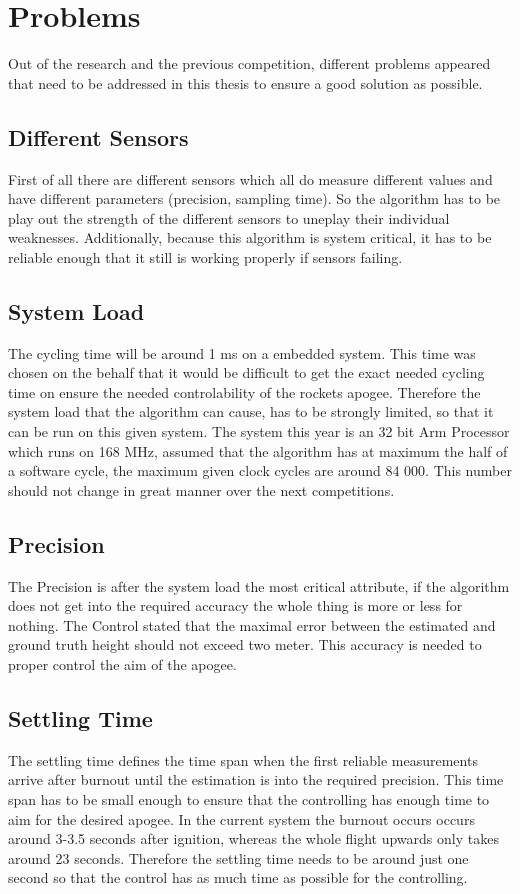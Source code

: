  
 \section{Problems}
 
 Out of the research and the previous competition, different problems appeared that need to be addressed in this thesis to ensure a good solution as possible.
 
 \subsection{Different Sensors}
 First of all there are different sensors which all do measure different values and have different parameters (precision, sampling time).
 So the algorithm has to be play out the strength of the different sensors to uneplay their individual weaknesses.
 Additionally, because this algorithm is system critical, it has to be reliable enough that it still is working properly if sensors failing. 
 
 
 \subsection{System Load}
 The cycling time will be around 1 ms on a embedded system. This time was chosen on the behalf that it would be difficult to get the exact needed cycling time on ensure the needed controlability of the rockets apogee.
 Therefore the system load that the algorithm can cause, has to be strongly limited, so that it can be run on this given system. 
 The system this year is an 32 bit Arm Processor which runs on 168 MHz, assumed that the algorithm has at maximum the half of a software cycle, the maximum given clock cycles are around 84 000.
 This number should not change in great manner over the next competitions.
 
 \subsection{Precision}
 The Precision is after the system load the most critical attribute, if the algorithm does not get into the required accuracy the whole thing is more or less for nothing.
 The Control stated that the maximal error between the estimated and ground truth height should not exceed two meter. This accuracy is needed to proper control the aim of the apogee.
 
 \subsection{Settling Time}
 The settling time defines the time span when the first reliable measurements arrive after burnout until the estimation is into the required precision.
 This time span has to be small enough to ensure that the controlling has enough time to aim for the desired apogee. In the current system the burnout occurs 
 occurs around 3-3.5 seconds after ignition, whereas the whole flight upwards only takes around 23 seconds. Therefore the settling time needs to be around just
 one second so that the control has as much time as possible for the controlling.
 
